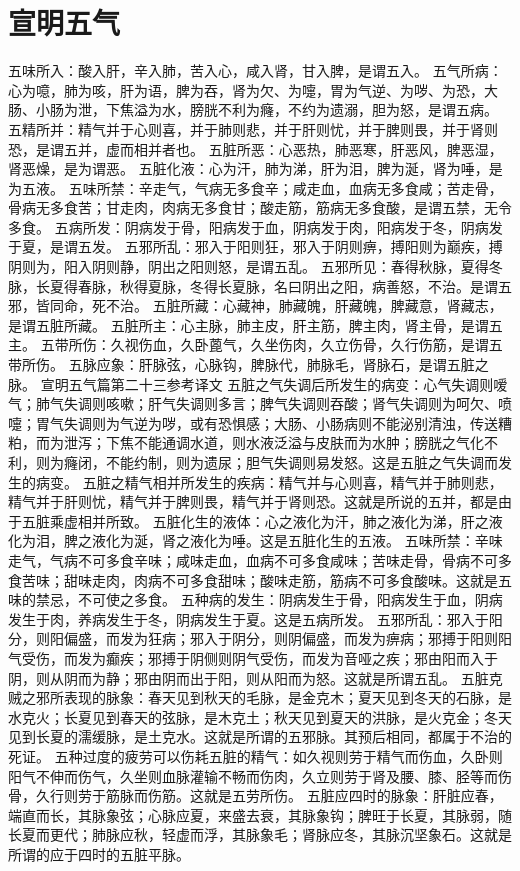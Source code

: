 \documentclass[a4paper,12pt,UTF8,twoside]{ctexbook}
\begin{document}
\chapter{宣明五气}

五味所入：酸入肝，辛入肺，苦入心，咸入肾，甘入脾，是谓五入。
五气所病：心为噫，肺为咳，肝为语，脾为吞，肾为欠、为嚏，胃为气逆、为哕、为恐，大肠、小肠为泄，下焦溢为水，膀胱不利为癃，不约为遗溺，胆为怒，是谓五病。
五精所并：精气并于心则喜，并于肺则悲，并于肝则忧，并于脾则畏，并于肾则恐，是谓五并，虚而相并者也。
五脏所恶：心恶热，肺恶寒，肝恶风，脾恶湿，肾恶燥，是为谓恶。
五脏化液：心为汗，肺为涕，肝为泪，脾为涎，肾为唾，是为五液。
五味所禁：辛走气，气病无多食辛；咸走血，血病无多食咸；苦走骨，骨病无多食苦；甘走肉，肉病无多食甘；酸走筋，筋病无多食酸，是谓五禁，无令多食。
五病所发：阴病发于骨，阳病发于血，阴病发于肉，阳病发于冬，阴病发于夏，是谓五发。
五邪所乱：邪入于阳则狂，邪入于阴则痹，搏阳则为巅疾，搏阴则为，阳入阴则静，阴出之阳则怒，是谓五乱。
五邪所见：春得秋脉，夏得冬脉，长夏得春脉，秋得夏脉，冬得长夏脉，名曰阴出之阳，病善怒，不治。是谓五邪，皆同命，死不治。
五脏所藏：心藏神，肺藏魄，肝藏魄，脾藏意，肾藏志，是谓五脏所藏。
五脏所主：心主脉，肺主皮，肝主筋，脾主肉，肾主骨，是谓五主。
五带所伤：久视伤血，久卧蓖气，久坐伤肉，久立伤骨，久行伤筋，是谓五带所伤。
五脉应象：肝脉弦，心脉钩，脾脉代，肺脉毛，肾脉石，是谓五脏之脉。
宣明五气篇第二十三参考译文
五脏之气失调后所发生的病变：心气失调则嗳气；肺气失调则咳嗽；肝气失调则多言；脾气失调则吞酸；肾气失调则为呵欠、喷嚏；胃气失调则为气逆为哕，或有恐惧感；大肠、小肠病则不能泌别清浊，传送糟粕，而为泄泻；下焦不能通调水道，则水液泛溢与皮肤而为水肿；膀胱之气化不利，则为癃闭，不能约制，则为遗尿；胆气失调则易发怒。这是五脏之气失调而发生的病变。
五脏之精气相并所发生的疾病：精气并与心则喜，精气并于肺则悲，精气并于肝则忧，精气并于脾则畏，精气并于肾则恐。这就是所说的五并，都是由于五脏乘虚相并所致。
五脏化生的液体：心之液化为汗，肺之液化为涕，肝之液化为泪，脾之液化为涎，肾之液化为唾。这是五脏化生的五液。
五味所禁：辛味走气，气病不可多食辛味；咸味走血，血病不可多食咸味；苦味走骨，骨病不可多食苦味；甜味走肉，肉病不可多食甜味；酸味走筋，筋病不可多食酸味。这就是五味的禁忌，不可使之多食。
五种病的发生：阴病发生于骨，阳病发生于血，阴病发生于肉，养病发生于冬，阴病发生于夏。这是五病所发。
五邪所乱：邪入于阳分，则阳偏盛，而发为狂病；邪入于阴分，则阴偏盛，而发为痹病；邪搏于阳则阳气受伤，而发为癫疾；邪搏于阴侧则阴气受伤，而发为音哑之疾；邪由阳而入于阴，则从阴而为静；邪由阴而出于阳，则从阳而为怒。这就是所谓五乱。
五脏克贼之邪所表现的脉象：春天见到秋天的毛脉，是金克木；夏天见到冬天的石脉，是水克火；长夏见到春天的弦脉，是木克土；秋天见到夏天的洪脉，是火克金；冬天见到长夏的濡缓脉，是土克水。这就是所谓的五邪脉。其预后相同，都属于不治的死证。
五种过度的疲劳可以伤耗五脏的精气：如久视则劳于精气而伤血，久卧则阳气不伸而伤气，久坐则血脉灌输不畅而伤肉，久立则劳于肾及腰、膝、胫等而伤骨，久行则劳于筋脉而伤筋。这就是五劳所伤。
五脏应四时的脉象：肝脏应春，端直而长，其脉象弦；心脉应夏，来盛去衰，其脉象钩；脾旺于长夏，其脉弱，随长夏而更代；肺脉应秋，轻虚而浮，其脉象毛；肾脉应冬，其脉沉坚象石。这就是所谓的应于四时的五脏平脉。
\end{document}
